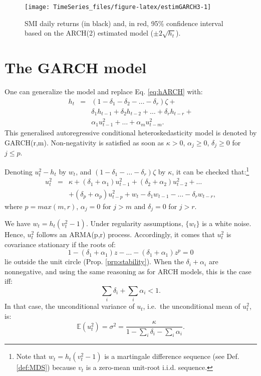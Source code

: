 \documentclass[
  12pt,
]{book}
\theoremstyle{definition}
\theoremstyle{definition}
\theoremstyle{definition}
\theoremstyle{definition}
\theoremstyle{remark}
\begin{document}
\begin{figure}
\texttt{[image: TimeSeries\_files/figure-latex/estimGARCH3-1]} \caption{SMI daily returns (in black) and, in red, 95\% confidence interval based on the ARCH(2) estimated model ($\pm 2 \sqrt{h_t}$).}\label{fig:estimGARCH3}
\end{figure}

\hypertarget{GARCH}{%
\section{The GARCH model}\label{GARCH}}

One can generalize the model and replace Eq. \eqref{eq:hARCH} with:
\begin{eqnarray}
h_t &=& (1-\delta_1 - \delta_2 - \dots - \delta_r) \zeta + \nonumber \\
&&\delta_1 h_{t-1} + \delta_2 h_{t-2} + \dots + \delta_r h_{t-r} + \nonumber \\
&&\alpha_1 u_{t-1}^2 + \dots + \alpha_m u_{t-m}^2. \label{eq:hGARCH}
\end{eqnarray}
This generalised autoregressive conditional heteroskedasticity model is denoted by GARCH(r,m). Non-negativity is satisfied as soon as \(\kappa>0\), \(\alpha_j \ge 0\), \(\delta_j \ge 0\) for \(j \le p\).

Denoting \(u_t^2 - h_t\) by \(w_t\), and \((1-\delta_1 - \dots - \delta_r) \zeta\) by \(\kappa\), it can be checked that:\footnote{Note that \(w_t=h_t(v_t^2 - 1)\) is a martingale difference sequence (see Def. \ref{def:MDS}) because \(v_t\) is a zero-mean unit-root i.i.d. sequence.}
\begin{eqnarray}
u_t^2 &=& \kappa + (\delta_1 + \alpha_1)u_{t-1}^2 + (\delta_2 + \alpha_2)u_{t-2}^2 + \dots \nonumber \\
&& + (\delta_p + \alpha_p)u_{t-p}^2 + w_t - \delta_1 w_{t-1} - \dots - \delta_r w_{t-r},
\end{eqnarray}
where \(p=max(m,r)\), \(\alpha_j=0\) for \(j>m\) and \(\delta_j=0\) for \(j>r\).

We have \(w_t = h_t(v_t^2 - 1)\). Under regularity assumptions, \(\{w_t\}\) is a white noise. Hence, \(u_t^2\) follows an ARMA(p,r) process. Accordingly, it comes that \(u_t^2\) is covariance stationary if the roots of:
\[
1 - (\delta_1 + \alpha_1)z - \dots - (\delta_1 + \alpha_1)z^p = 0
\]
lie outside the unit circle (Prop. \ref{prp:stability}). When the \(\delta_i + \alpha_i\) are nonnegative, and using the same reasoning as for ARCH models, this is the case iff:
\[
\sum_i \delta_i + \sum_i \alpha_i < 1.
\]
In that case, the unconditional variance of \(u_t\), i.e.~the unconditional mean of \(u_t^2\), is:
\[
\mathbb{E}(u_t^2) = \sigma^2 = \frac{\kappa}{1 - \sum_i \delta_i - \sum_i \alpha_i}.
\]
\end{document}

